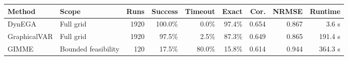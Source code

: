 \begin{tabular}{llrrrrrrr}
\toprule
Method & Scope & Runs & Success & Timeout & Exact & Cor. & NRMSE & Runtime \\
\midrule
DynEGA & Full grid & 1920 & 100.0\% & 0.0\% & 97.4\% & 0.654 & 0.867 & 3.6 s \\
GraphicalVAR & Full grid & 1920 & 97.5\% & 2.5\% & 87.3\% & 0.649 & 0.865 & 191.4 s \\
GIMME & Bounded feasibility & 120 & 17.5\% & 80.0\% & 15.8\% & 0.614 & 0.944 & 364.3 s \\
\bottomrule
\end{tabular}
